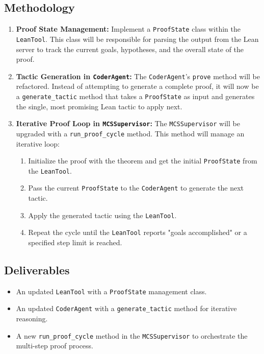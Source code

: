 \documentclass{article}
\begin{document}
\subsection{Methodology}
\begin{enumerate}
    \item \textbf{Proof State Management:} Implement a \texttt{ProofState} class within the \texttt{LeanTool}. This class will be responsible for parsing the output from the Lean server to track the current goals, hypotheses, and the overall state of the proof.
    \item \textbf{Tactic Generation in \texttt{CoderAgent}:} The \texttt{CoderAgent}'s \texttt{prove} method will be refactored. Instead of attempting to generate a complete proof, it will now be a \texttt{generate\_tactic} method that takes a \texttt{ProofState} as input and generates the single, most promising Lean tactic to apply next.
    \item \textbf{Iterative Proof Loop in \texttt{MCSSupervisor}:} The \texttt{MCSSupervisor} will be upgraded with a \texttt{run\_proof\_cycle} method. This method will manage an iterative loop:
        \begin{enumerate}
            \item Initialize the proof with the theorem and get the initial \texttt{ProofState} from the \texttt{LeanTool}.
            \item Pass the current \texttt{ProofState} to the \texttt{CoderAgent} to generate the next tactic.
            \item Apply the generated tactic using the \texttt{LeanTool}.
            \item Repeat the cycle until the \texttt{LeanTool} reports "goals accomplished" or a specified step limit is reached.
        \end{enumerate}
\end{enumerate}

\subsection{Deliverables}
\begin{itemize}
    \item An updated \texttt{LeanTool} with a \texttt{ProofState} management class.
    \item An updated \texttt{CoderAgent} with a \texttt{generate\_tactic} method for iterative reasoning.
    \item A new \texttt{run\_proof\_cycle} method in the \texttt{MCSSupervisor} to orchestrate the multi-step proof process.
\end{itemize}
\end{document}
